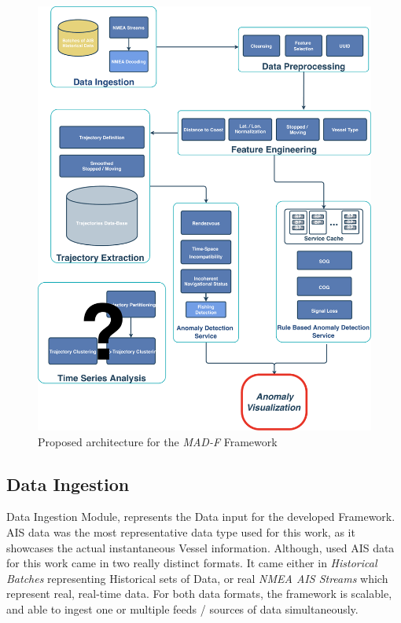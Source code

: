 \begin{figure}[H]
\centering
\includegraphics[scale = .35]{figures/Ch3/Framework.pdf}
\caption{Proposed architecture for the \emph{MAD-F} Framework}
\label{fig:Framework}
\end{figure}

\subsection{Data Ingestion}
\label{subsection: Data Ingestion}
Data Ingestion Module, represents the Data input for the developed Framework. AIS data was the most representative data type used for this work, as it showcases the actual instantaneous Vessel information.
Although, used AIS data for this work came in two really distinct formats. It came either in \emph{Historical Batches} representing Historical sets of Data, or real \emph{NMEA AIS Streams} which represent real, real-time data. For both data formats, the framework is scalable, and able to ingest one or multiple feeds / sources of data simultaneously.


